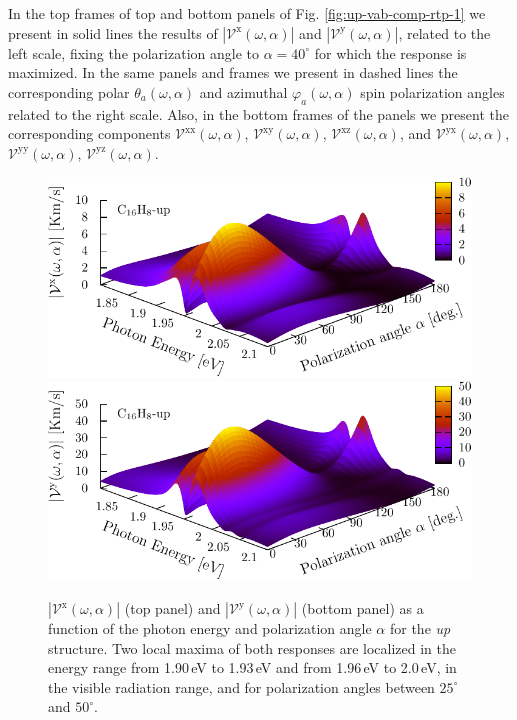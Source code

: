 \documentclass[prb,11pt,tightenlines,twocolumn,aps]{revtex4-1}
\begin{document}
In the top frames of top and bottom panels of Fig. \ref{fig:up-vab-comp-rtp-1}
we present in solid lines the results of
$|\mathcal{V}^{\mathrm{x}}(\omega,\alpha)|$ and
$|\mathcal{V}^{\mathrm{y}}(\omega,\alpha)|$, related to the left scale, fixing
the polarization angle to $\alpha=40^{\circ}$ for which the response is
maximized. In the same panels and frames we present in dashed lines the
corresponding polar $\theta_{a}(\omega,\alpha)$ and azimuthal
$\varphi_{a}(\omega,\alpha)$ spin polarization angles related to the right
scale. Also, in the bottom frames of the panels we present the corresponding
components $\mathcal{V}^{\mathrm{xx}}(\omega,\alpha)$,
$\mathcal{V}^{\mathrm{xy}}(\omega,\alpha)$,
$\mathcal{V}^{\mathrm{xz}}(\omega,\alpha)$, and
$\mathcal{V}^{\mathrm{yx}}(\omega,\alpha)$,
$\mathcal{V}^{\mathrm{yy}}(\omega,\alpha)$,
$\mathcal{V}^{\mathrm{yz}}(\omega,\alpha)$.
\begin{figure}[t]
    \centering
    \includegraphics[width=\linewidth]{upplots/up-3d-vxb-2}
    \\
    \includegraphics[width=\linewidth]{upplots/up-3d-vyb-2}
    
    \caption{$|\mathcal{V}^{\mathrm{x}}(\omega,\alpha)|$ (top panel) and
    $|\mathcal{V}^{\mathrm{y}}(\omega,\alpha)|$ (bottom panel)  as a function of
    the photon energy and polarization angle $\alpha$ for the \emph{up}
    structure. Two local maxima of both responses are localized in the energy
    range from 1.90\,eV to 1.93\,eV and from 1.96\,eV to 2.0\,eV, in the visible
    radiation range, and for polarization angles between $25^{\circ}$ and
    $50^{\circ}$.}
    \label{fig:up-3d-vva-2}
\end{figure}
\end{document}
